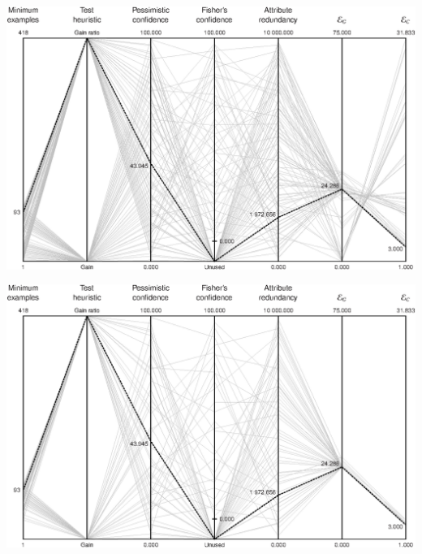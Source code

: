 \documentclass{article}
\begin{document}
\centerline{\includegraphics{c4-5_monks1_generalization.ps}}

\centerline{\includegraphics{c4-5_monks1_conditions.ps}}
\end{document}
